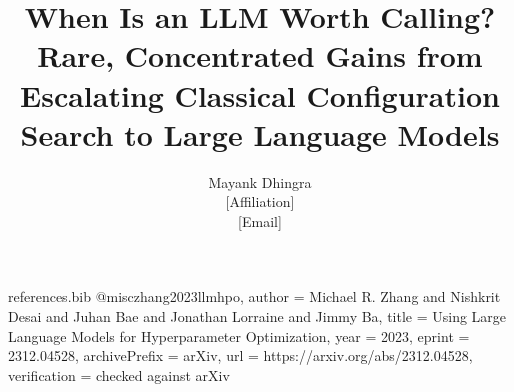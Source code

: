\begin{filecontents*}[overwrite]{references.bib}
@misc{zhang2023llmhpo,
  author = {Michael R. Zhang and Nishkrit Desai and Juhan Bae and Jonathan Lorraine and Jimmy Ba},
  title = {Using Large Language Models for Hyperparameter Optimization},
  year = {2023},
  eprint = {2312.04528},
  archivePrefix = {arXiv},
  url = {https://arxiv.org/abs/2312.04528},
  verification = {checked against arXiv}
}
\end{filecontents*}

\documentclass[11pt]{article}

\usepackage[utf8]{inputenc}
\usepackage[T1]{fontenc}
\usepackage{lmodern}
\usepackage[margin=1in]{geometry}
\usepackage{amsmath}
\usepackage{booktabs}
\usepackage{graphicx}
\usepackage{multirow}
\usepackage{array}
\usepackage{xcolor}
\usepackage[numbers,sort&compress]{natbib}
\usepackage[hidelinks]{hyperref}
\usepackage{microtype}

\newcommand{\RQ}[1]{\textbf{RQ#1}}

\title{When Is an LLM Worth Calling?\\[4pt]
\large Rare, Concentrated Gains from Escalating Classical Configuration Search to Large Language Models}

\author{Mayank Dhingra\\
\small [Affiliation]\\
\small [Email]}

\date{}


\maketitle

